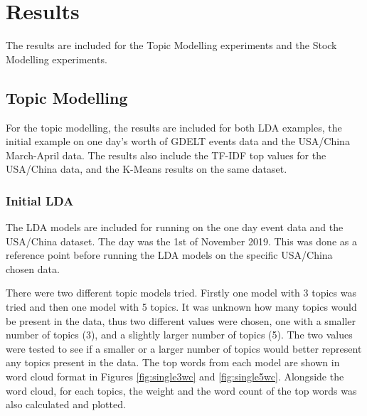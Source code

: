 \section{Results}
\label{results}
The results are included for the Topic Modelling experiments and the Stock Modelling experiments. 

\subsection{Topic Modelling}
For the topic modelling, the results are included for both LDA examples, the initial example on one day's worth of GDELT events data and the USA/China March-April data. The results also include the TF-IDF top values for the USA/China data, and the K-Means results on the same dataset.

\subsubsection{Initial LDA}
The LDA models are included for running on the one day event data and the USA/China dataset. The day was the 1st of November 2019. This was done as a reference point before running the LDA models on the specific USA/China chosen data.

There were two different topic models tried. Firstly one model with 3 topics was tried and then one model with 5 topics. It was unknown how many topics would be present in the data, thus two different values were chosen, one with a smaller number of topics (3), and a slightly larger number of topics (5). The two values were tested to see if a smaller or a larger number of topics would better represent any topics present in the data. The top words from each model are shown in word cloud format in Figures \ref{fig:single3wc} and \ref{fig:single5wc}. Alongside the word cloud, for each topics, the weight and the word count of the top words was also calculated and plotted. 
	
